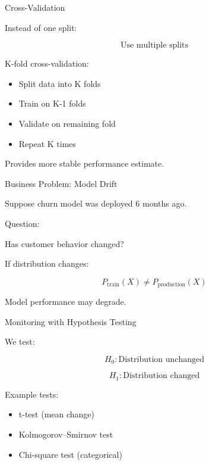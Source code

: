 \documentclass{beamer}
\begin{document}
\begin{frame}{Cross-Validation}

Instead of one split:

\[
\text{Use multiple splits}
\]

\vspace{0.5cm}

K-fold cross-validation:

\begin{itemize}
    \item Split data into K folds
    \item Train on K-1 folds
    \item Validate on remaining fold
    \item Repeat K times
\end{itemize}

\vspace{0.5cm}

Provides more stable performance estimate.

\end{frame}

\begin{frame}{Business Problem: Model Drift}

Suppose churn model was deployed 6 months ago.

\vspace{0.5cm}

Question:

Has customer behavior changed?

\vspace{0.5cm}

If distribution changes:

\[
P_{\text{train}}(X) \neq P_{\text{production}}(X)
\]

Model performance may degrade.

\end{frame}

\begin{frame}{Monitoring with Hypothesis Testing}

We test:

\[
H_0: \text{Distribution unchanged}
\]

\[
H_1: \text{Distribution changed}
\]

\vspace{0.5cm}

Example tests:

\begin{itemize}
    \item t-test (mean change)
    \item Kolmogorov–Smirnov test
    \item Chi-square test (categorical)
\end{itemize}

\end{frame}
\end{document}
